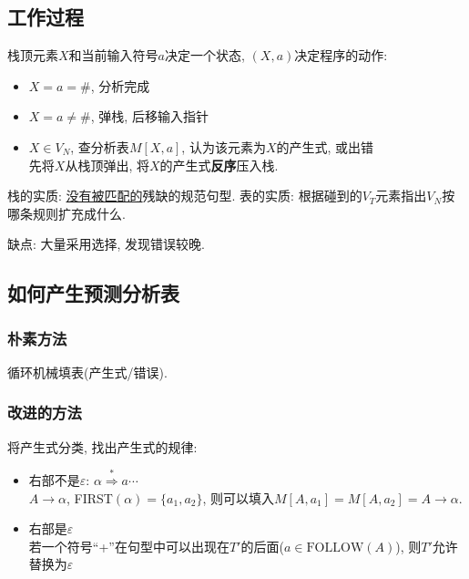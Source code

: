         \subsection{工作过程}

            栈顶元素$X$和当前输入符号$a$决定一个\textsf{状态}, $(X,a)$决定程序的动作:
            \begin{itemize}
                \item $X=a=\#$, 分析完成
                \item $X=a\not =\#$, 弹栈, 后移输入指针
                \item $X\in V_N$, 查分析表$M[X,a]$, 认为该元素为$X$的产生式, 或出错 \\
                    先将$X$从栈顶弹出, 将$X$的产生式\textbf{反序}压入栈.
            \end{itemize}

                栈的实质: \uline{没有被匹配的}残缺的规范句型. 表的实质: 根据碰到的$V_T$元素指出$V_N$按哪条规则扩充成什么.

                缺点: 大量采用选择, 发现错误较晚.

        \subsection{如何产生预测分析表}

            \subsubsection{朴素方法} 循环机械填表(产生式/错误).

            \subsubsection{改进的方法} 将产生式分类, 找出产生式的规律:
                \begin{itemize}
                    \item 右部不是$\varepsilon$: $\alpha\stackrel{*}{\Rightarrow}a\cdots$\\
                        $A\to \alpha$, FIRST$(\alpha)=\{a_1,a_2\}$, 则可以填入$M[A,a_1]=M[A,a_2]=A\to\alpha$.
                    \item 右部是$\varepsilon$ \\
                        若一个符号``+''在句型中可以出现在$T'$的后面($a\in\mathrm{FOLLOW}(A)$), 则$T'$允许替换为$\varepsilon$
                \end{itemize}

